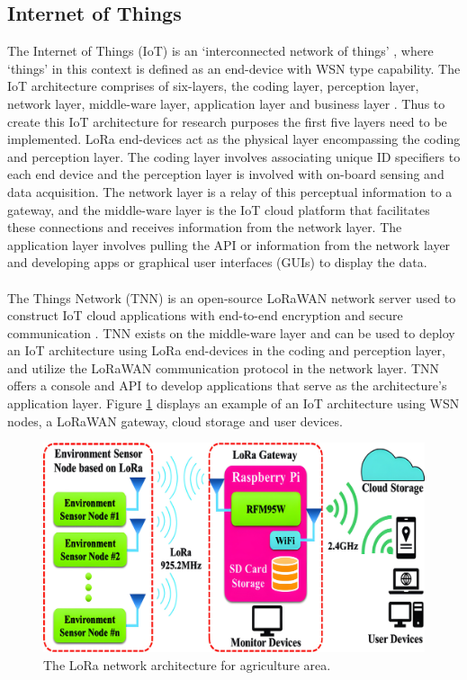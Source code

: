 \subsection{Internet of Things}
The Internet of Things (IoT) is an `interconnected network of things' \cite{IoT}, where `things' in this context is defined as an end-device with WSN type capability. The IoT architecture comprises of six-layers, the coding layer, perception layer, network layer, middle-ware layer, application layer and business layer \cite{IoT}. Thus to create this IoT architecture for research purposes the first five layers need to be implemented. LoRa end-devices act as the physical layer encompassing the coding and perception layer. The coding layer involves associating unique ID specifiers to each end device \cite{IoT} and the perception layer is involved with on-board sensing and data acquisition. The network layer is a relay of this perceptual information to a gateway, and the middle-ware layer is the IoT cloud platform that facilitates these connections and receives information from the network layer. The application layer involves pulling the API or information from the network layer and developing apps or graphical user interfaces (GUIs) to display the data.\\\\
The Things Network (TNN) is an open-source LoRaWAN network server used to construct IoT cloud applications with end-to-end encryption and secure communication \cite{LoRaWAN-Smart-Infrastructure-Monitoring}. TNN exists on the middle-ware layer and can be used to deploy an IoT architecture using LoRa end-devices in the coding and perception layer, and utilize the LoRaWAN communication protocol in the network layer. TNN offers a console and API to develop applications that serve as the architecture's application layer. Figure \ref{LoRa-IOT-Example} displays an example of an IoT architecture using WSN nodes, a LoRaWAN gateway, cloud storage and user devices. 

\begin{figure}[h]
	\centering
	\caption{The LoRa network architecture for agriculture area. \cite{LoRaWAN-WSN-Agricultual-Application}}
	\label{LoRa-IOT-Example}
	\includegraphics[scale=0.1]{Sections/Introduction/LoRaWAN-IOT-Example.jpg}
\end{figure}



